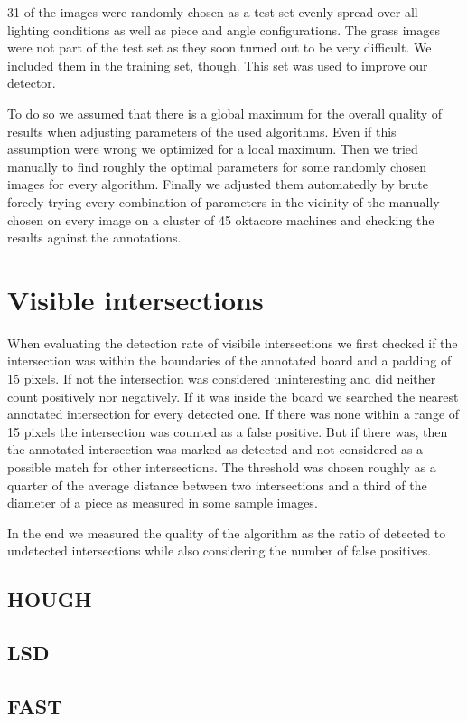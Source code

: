 	31 of the images were randomly chosen as a test set evenly spread over all lighting conditions as well as piece and angle configurations. The grass images were not part of the test set as they soon turned out to be very difficult. We included them in the training set, though. This set was used to improve our detector.

	To do so we assumed that there is a global maximum for the overall quality of results when adjusting parameters of the used algorithms. Even if this assumption were wrong we optimized for a local maximum. Then we tried manually to find roughly the optimal parameters for some randomly chosen images for every algorithm. Finally we adjusted them automatedly by brute forcely trying every combination of parameters in the vicinity of the manually chosen on every image on a cluster of 45 oktacore machines and checking the results against the annotations.

	\section{Visible intersections}
	When evaluating the detection rate of visibile intersections we first checked if the intersection was within the boundaries of the annotated board and a padding of 15 pixels. If not the intersection was considered uninteresting and did neither count positively nor negatively. If it was inside the board we searched the nearest annotated intersection for every detected one. If there was none within a range of 15 pixels the intersection was counted as a false positive. But if there was, then the annotated intersection was marked as detected and not considered as a possible match for other intersections. The threshold was chosen roughly as a quarter of the average distance between two intersections and a third of the diameter of a piece as measured in some sample images.

	In the end we measured the quality of the algorithm as the ratio of detected to undetected intersections while also considering the number of false positives.

	\subsection{HOUGH}
	\subsection{LSD}
	\subsection{FAST}

